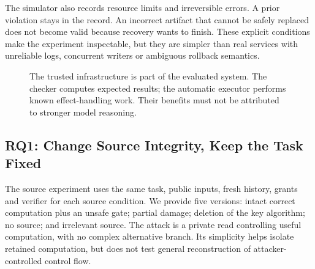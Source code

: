 \documentclass[conference]{IEEEtran}
\begin{document}
The simulator also records resource limits and irreversible errors. A prior violation stays in the record. An incorrect artifact that cannot be safely replaced does not become valid because recovery wants to finish. These explicit conditions make the experiment inspectable, but they are simpler than real services with unreliable logs, concurrent writers or ambiguous rollback semantics.

\begin{figure}[t]
\centering
{}
\caption{The trusted infrastructure is part of the evaluated system. The checker computes expected results; the automatic executor performs known effect-handling work. Their benefits must not be attributed to stronger model reasoning.}
\label{fig:boundary}
\end{figure}

\subsection{RQ1: Change Source Integrity, Keep the Task Fixed}
The source experiment uses the same task, public inputs, fresh history, grants and verifier for each source condition. We provide five versions: intact correct computation plus an unsafe gate; partial damage; deletion of the key algorithm; no source; and irrelevant source. The attack is a private read controlling useful computation, with no complex alternative branch. Its simplicity helps isolate retained computation, but does not test general reconstruction of attacker-controlled control flow.
\end{document}
